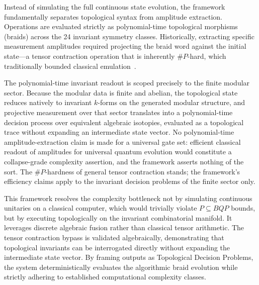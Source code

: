 Instead of simulating the full continuous state evolution, the framework fundamentally separates topological syntax from amplitude extraction. Operations are evaluated strictly as polynomial-time topological morphisms (braids) across the 24 invariant symmetry classes. Historically, extracting specific measurement amplitudes required projecting the braid word against the initial state---a tensor contraction operation that is inherently $\#P$-hard, which traditionally bounded classical emulation~\cite{bernstein1997}. 

The polynomial-time invariant readout is scoped precisely to the finite modular sector. Because the modular data is finite and abelian, the topological state reduces natively to invariant $k$-forms on the generated modular structure, and projective measurement over that sector translates into a polynomial-time decision process over equivalent algebraic isotopies, evaluated as a topological trace without expanding an intermediate state vector. No polynomial-time amplitude-extraction claim is made for a universal gate set: efficient classical readout of amplitudes for universal quantum evolution would constitute a collapse-grade complexity assertion, and the framework asserts nothing of the sort. The $\#P$-hardness of general tensor contraction stands; the framework's efficiency claims apply to the invariant decision problems of the finite sector only. 

This framework resolves the complexity bottleneck not by simulating continuous unitaries on a classical computer, which would trivially violate $P \subseteq BQP$ bounds, but by executing topologically on the invariant combinatorial manifold. It leverages discrete algebraic fusion rather than classical tensor arithmetic. The tensor contraction bypass is validated algebraically, demonstrating that topological invariants can be interrogated directly without expanding the intermediate state vector. By framing outputs as Topological Decision Problems, the system deterministically evaluates the algorithmic braid evolution while strictly adhering to established computational complexity classes.
